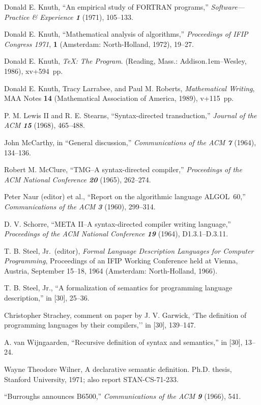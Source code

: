 \bib
[21] Donald E. Knuth, ``An empirical study of FORTRAN programs,''
{\sl Software---Practice \& Experience\/ \bf 1} (1971), 105--133.

\bib
[22] Donald E. Knuth, ``Mathematical analysis of algorithms,''
{\sl Proceedings of IFIP Congress 1971}, {\bf 1} (Amsterdam:
North-Holland, 1972), 19--27.

\bib
[23] Donald E. Knuth, {\sl \TeX: The Program}. (Reading, Mass.:
Addison\kern.1em--Wesley, 1986), xv+594~pp.

\bib
[24] Donald E. Knuth, Tracy Larrabee, and Paul M. Roberts, {\sl
Mathematical Writing}, MAA Notes {\bf 14} (Mathematical Association of
America, 1989), v+115~pp.

\bib 
[25] P. M. Lewis II and R. E. Stearns, ``Syntax-directed
transduction,''
{\sl Journal of the ACM\/ \bf 15} (1968), 465--488.

\bib
[26] John McCarthy, in ``General discussion,'' {\sl Communications of
the ACM\/ \bf 7} (1964), 134--136.

\bib
[27] Robert M. McClure, ``TMG--A syntax-directed compiler,'' {\sl
Proceedings of the ACM National Conference\/ \bf 20} (1965),
262--274.

\bib
[28] Peter Naur (editor) et al., ``Report on the algorithmic
language 
{\ninerm ALGOL}~60,'' {\sl Communications of the ACM\/ \bf 3} (1960),
299--314.

\bib
[29] D. V. Schorre, ``META II--A syntax-directed compiler writing
language,'' {\sl Proceedings of the ACM National Conference\/ \bf 19}
(1964), D1.3.1--D.3.11.

\bib
[30] T. B. Steel, Jr.~(editor),
{\sl Formal Language
Description Languages for Computer Programming},
Proceedings of an IFIP Working Conference held at
 Vienna, Austria, September 15--18, 1964
(Amsterdam: North-Holland, 1966).

\bib
[31] T. B. Steel, Jr., ``A formalization of semantics for
programming language description,'' in 
[30], 25--36.

\bib
[32] Christopher Strachey, comment on paper by J. V. Garwick, 
`The definition of programming languages by their compilers,''
in [30], 139--147.

\bib
[33] A. van Wijngaarden, ``Recursive definition of syntax and
semantics,'' in [30], 13--24.

\bib
[34] Wayne Theodore Wilner, A declarative semantic definition.
Ph.D. thesis, Stanford University, 1971; also report STAN-CS-71-233.

\bib
[35] ``Burroughs announces B6500,'' {\sl Communications of the ACM\/ 
\bf 9} (1966), 541.

